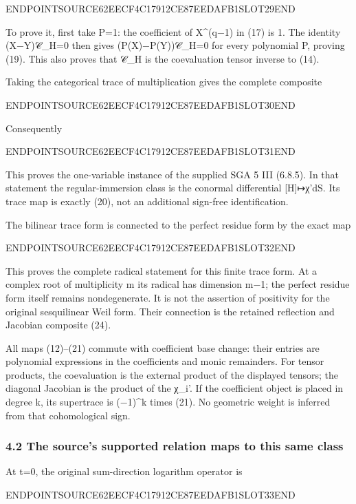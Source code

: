 ENDPOINTSOURCE62EECF4C17912CE87EEDAFB1SLOT29END

To prove it, first take P=1: the coefficient of X\^{}(q−1) in (17) is 1. The identity (X−Y)𝒞\_H=0 then gives (P(X)−P(Y))𝒞\_H=0 for every polynomial P, proving (19). This also proves that 𝒞\_H is the coevaluation tensor inverse to (14).

Taking the categorical trace of multiplication gives the complete composite

ENDPOINTSOURCE62EECF4C17912CE87EEDAFB1SLOT30END

Consequently

ENDPOINTSOURCE62EECF4C17912CE87EEDAFB1SLOT31END

This proves the one-variable instance of the supplied SGA 5 III (6.8.5). In that statement the regular-immersion class is the conormal differential {[}H{]}↦χ'dS. Its trace map is exactly (20), not an additional sign-free identification.

The bilinear trace form is connected to the perfect residue form by the exact map

ENDPOINTSOURCE62EECF4C17912CE87EEDAFB1SLOT32END

This proves the complete radical statement for this finite trace form. At a complex root of multiplicity m its radical has dimension m−1; the perfect residue form itself remains nondegenerate. It is not the assertion of positivity for the original sesquilinear Weil form. Their connection is the retained reflection and Jacobian composite (24).

All maps (12)--(21) commute with coefficient base change: their entries are polynomial expressions in the coefficients and monic remainders. For tensor products, the coevaluation is the external product of the displayed tensors; the diagonal Jacobian is the product of the χ\_i'. If the coefficient object is placed in degree k, its supertrace is (−1)\^{}k times (21). No geometric weight is inferred from that cohomological sign.

\subsubsection{4.2 The source's supported relation maps to this same class}\label{endpoint-sga_trace_period--the-sources-supported-relation-maps-to-this-same-class}

At t=0, the original sum-direction logarithm operator is

ENDPOINTSOURCE62EECF4C17912CE87EEDAFB1SLOT33END

